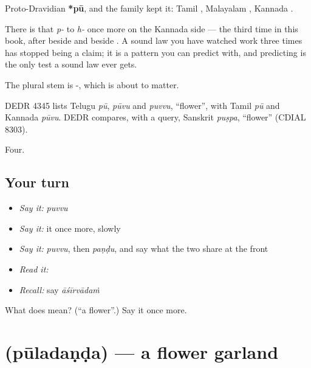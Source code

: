 Proto-Dravidian \textbf{*pū}, and the family kept it: Tamil , Malayalam , Kannada .

There is that \emph{p-} to \emph{h-} once more on the Kannada side — the third time in this book, after  beside  and  beside . A sound law you have watched work three times has stopped being a claim; it is a pattern you can predict with, and predicting is the only test a sound law ever gets.

The plural stem is -, which is about to matter.

DEDR 4345 lists Telugu \emph{pū}, \emph{pūvu} and \emph{puvvu}, \textquotedblleft{}flower\textquotedblright{}, with Tamil \emph{pū} and Kannada \emph{pūvu}. DEDR compares, with a query, Sanskrit \emph{puṣpa}, \textquotedblleft{}flower\textquotedblright{} (CDIAL 8303).

\begin{grammarlens}[title={What you've built}]
Four.
\end{grammarlens}

\subsection*{Your turn}
\begin{itemize}
\raggedright
  \item \emph{Say it:} \emph{puvvu}
  \item \emph{Say it:} it once more, slowly
  \item \emph{Say it:} \emph{puvvu}, then \emph{paṇḍu}, and say what the two share at the front
  \item \emph{Read it:} \textbf{}
  \item \emph{Recall:} say \emph{āśīrvādaṁ}
\end{itemize}

\begin{tcolorbox}[breakable,colback=teal!4,colframe=teal!35!black,title={Before you move on}]
What does  mean? (\textquotedblleft{}a flower\textquotedblright{}.) Say it once more.
\end{tcolorbox}
\section[\texorpdfstring{\te{పూలదండ} (pūladaṇḍa)}{పూలదండ (pūladaṇḍa)}]{ (pūladaṇḍa) — a flower garland}

\label{lesson:TE-C52-garland}



